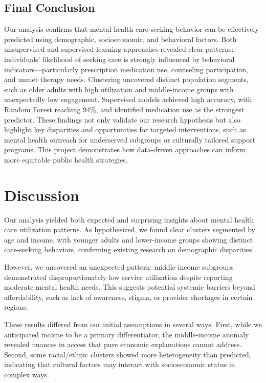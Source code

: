 \documentclass{article}
\begin{document}
\subsection{Final Conclusion}
Our analysis confirms that mental health care-seeking behavior can be effectively predicted using demographic, socioeconomic, and behavioral factors. Both unsupervised and supervised learning approaches revealed clear patterns: individuals' likelihood of seeking care is strongly influenced by behavioral indicators—particularly prescription medication use, counseling participation, and unmet therapy needs. Clustering uncovered distinct population segments, such as older adults with high utilization and middle-income groups with unexpectedly low engagement. Supervised models achieved high accuracy, with Random Forest reaching 94\%, and identified medication use as the strongest predictor. These findings not only validate our research hypothesis but also highlight key disparities and opportunities for targeted interventions, such as mental health outreach for underserved subgroups or culturally tailored support programs. This project demonstrates how data-driven approaches can inform more equitable public health strategies.

\section{Discussion}

Our analysis yielded both expected and surprising insights about mental health care utilization patterns. As hypothesized, we found clear clusters segmented by age and income, with younger adults and lower-income groups showing distinct care-seeking behaviors, confirming existing research on demographic disparities.

\vspace{0.5cm}

However, we uncovered an unexpected pattern: middle-income subgroups demonstrated disproportionately low service utilization despite reporting moderate mental health needs. This suggests potential systemic barriers beyond affordability, such as lack of awareness, stigma, or provider shortages in certain regions.

\vspace{0.5cm}

These results differed from our initial assumptions in several ways. First, while we anticipated income to be a primary differentiator, the middle-income anomaly revealed nuances in access that pure economic explanations cannot address. Second, some racial/ethnic clusters showed more heterogeneity than predicted, indicating that cultural factors may interact with socioeconomic status in complex ways.
\end{document}

